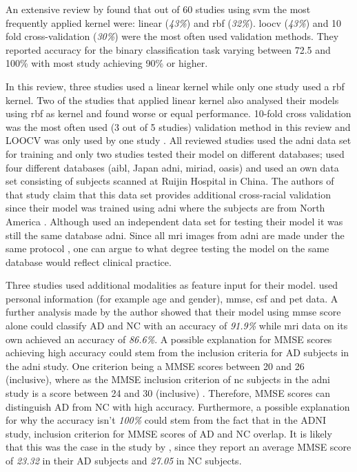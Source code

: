 An extensive review by \textcite{tanveerMachineLearningTechniques2020} found that out of 60 studies using \gls{svm} the most frequently applied kernel were: linear (\textit{43\%}) and \gls{rbf} (\textit{32\%}). \gls{loocv} (\textit{43\%}) and 10 fold cross-validation (\textit{30\%}) were the most often used validation methods. They reported accuracy for the binary classification task varying between 72.5 and 100\% with most study achieving 90\% or higher. 

In this review, three studies used a linear kernel while only one study used a \gls{rbf} kernel. Two of the studies that applied linear kernel also analysed their models using \gls{rbf} as kernel and found worse \autocite{khatriEfficientCombinationSMRI2020a} or equal \autocite{akramifardEmphasisLearningFeatures2020} performance. 10-fold cross validation was the most often used (3 out of 5 studies) validation method in this review and LOOCV was only used by one study \autocite{syaifullahMachineLearningDiagnosis2021}. All reviewed studies used the \gls{adni} data set for training and only two studies tested their model on different databases; \textcite{syaifullahMachineLearningDiagnosis2021} used four different databases (\gls{aibl}, Japan \gls{adni}, \gls{miriad}, \gls{oasis}) and \textcite{liuMultimodelDeepConvolutional2020a} used an own data set consisting of subjects scanned at Ruijin Hospital in China. The authors of that study claim that this data set provides additional cross-racial validation since their model was trained using \gls{adni} where the subjects are from North America \autocite{weiner2013alzheimer}. Although \textcite{richhariyaDiagnosisAlzheimerDisease2020} used an independent data set for testing their model it was still the same database \gls{adni}. Since all \gls{mri} images from \gls{adni} are made under the same protocol \autocite{jack2008alzheimer}, one can argue to what degree testing the model on the same database would reflect clinical practice. 

Three studies used additional modalities as feature input for their model. \textcite{akramifardEmphasisLearningFeatures2020} used personal information (for example age and gender), \gls{mmse}, \gls{csf} and \gls{pet} data. A further analysis made by the author showed that their model using \gls{mmse} score alone could classify AD and NC with an accuracy of \textit{91.9\%} while \gls{mri} data on its own achieved an accuracy of \textit{86.6\%}. A possible explanation for MMSE scores achieving high accuracy could stem from the inclusion criteria for AD subjects in the \gls{adni} study. One criterion being a MMSE scores between 20 and 26 (inclusive), where as the MMSE inclusion criterion of \gls{nc} subjects in the \gls{adni} study is a score between 24 and 30 (inclusive) \autocite{Petersen201}. Therefore, MMSE scores can distinguish AD from NC with high accuracy. Furthermore, a possible explanation for why the accuracy isn't \textit{100\%} could stem from the fact that in the ADNI study, inclusion criterion for MMSE scores of AD and NC overlap. It is likely that this was the case in the study by \textcite{akramifardEmphasisLearningFeatures2020}, since they report an average MMSE score of \textit{23.32} in their AD subjects and \textit{27.05} in NC subjects.


